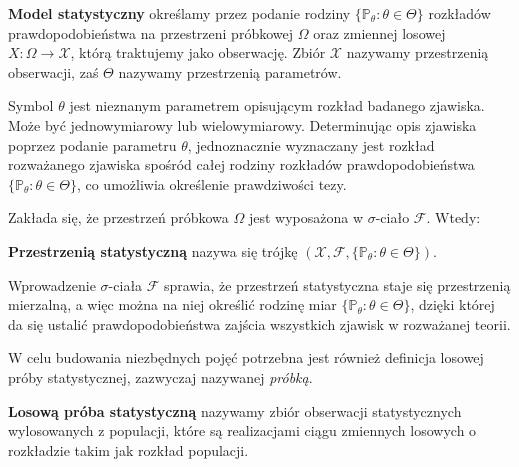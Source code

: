 \begin{definition}
\textbf{Model statystyczny} określamy przez podanie rodziny $\{ \mathbb P_{\theta}:\theta\in\Theta\} $ rozkładów prawdopodobieństwa na przestrzeni próbkowej $\Omega$ oraz zmiennej losowej $X : \Omega \rightarrow \mathcal{X}$, którą traktujemy jako obserwację. Zbiór $\mathcal{X}$ nazywamy przestrzenią obserwacji, zaś $\Theta$ nazywamy przestrzenią parametrów. \\
\end{definition}
Symbol $\theta$ jest nieznanym parametrem opisującym rozkład badanego zjawiska. Może być jednowymiarowy lub wielowymiarowy. Determinując opis zjawiska poprzez podanie parametru $\theta$, jednoznacznie wyznaczany jest rozkład rozważanego zjawiska spośród całej rodziny rozkładów prawdopodobieństwa $\{ \mathbb P_{\theta}:\theta\in\Theta\}$, co umożliwia określenie prawdziwości tezy.
\par
Zakłada się, że przestrzeń próbkowa $\Omega$ jest wyposażona w $\sigma$-ciało $\mathcal{F}$. Wtedy:
\begin{definition}
\textbf{Przestrzenią statystyczną} nazywa się trójkę $(\mathcal{X},\mathcal{F},\{\mathbb P_{\theta}:\theta\in\Theta\})$.
\end{definition}
Wprowadzenie $\sigma$-ciała $\mathcal{F}$ sprawia, że przestrzeń statystyczna staje się przestrzenią mierzalną, a więc można na niej określić rodzinę miar $\{ \mathbb P_{\theta}:\theta\in\Theta\} $, dzięki której da się ustalić prawdopodobieństwa$  $ zajścia wszystkich zjawisk w rozważanej teorii.

W celu budowania niezbędnych pojęć potrzebna jest również definicja losowej próby statystycznej, zazwyczaj nazywanej \textit{próbką}.

\begin{definition}
 \textbf{Losową próba statystyczną} nazywamy zbiór obserwacji statystycznych wylosowanych z populacji, które są realizacjami ciągu zmiennych losowych o rozkładzie takim jak rozkład populacji.
 \end{definition}
